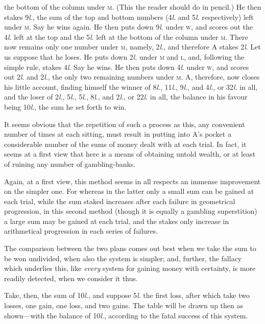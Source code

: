 \documentclass[letterpaper,12pt,oneside,openany]{memoir}
\begin{document}
the bottom of the column under \textsc{m}. (This the reader
should do in pencil.) He then stakes 9\textit{l}., the sum of
the top and bottom numbers (4\textit{l}. and 5\textit{l}. respectively)
left under \textsc{m}. Say he wins again. He then puts down
9\textit{l}. under \textsc{w}, and scores out the 4\textit{l}. left at the top and
the 5\textit{l}. left at the bottom of the column under \textsc{m}. There
now remains only one number under \textsc{m}, namely, 2\textit{l}., and
therefore A stakes 2\textit{l}. Let us suppose that he loses.
He puts down 2\textit{l}. under \textsc{m} and \textsc{l}, and, following the
simple rule, stakes 4\textit{l}. Say he wins. He then puts
down 4\textit{l}. under \textsc{w}, and scores out 2\textit{l}. and 2\textit{l}., the only
two remaining numbers under \textsc{m}. A, therefore, now
closes his little account, finding himself the winner of
8\textit{l}., 11\textit{l}., 9\textit{l}.,
and 4\textit{l}., or 32\textit{l}. in all, and the loser of 2\textit{l}.,
5\textit{l}., 5\textit{l}., 8\textit{l}., and 2\textit{l}., or 22\textit{l}. in all, the balance in his
favour being 10\textit{l}., the sum he set forth to win.

It seems obvious that the repetition of such a process
as this, any convenient number of times at each
sitting, must result in putting into A's pocket a considerable
number of the sums of money dealt with at
each trial. In fact, it seems at a first view that here is
a means of obtaining untold wealth, or at least of ruining
any number of gambling-banks.

Again, at a first view, this method seems in all
respects an immense improvement on the simpler one.
For whereas in the latter only a small sum can be
gained at each trial, while the sum staked increases
after each failure in geometrical progression, in this
second method (though it is equally a gambling superstition)
a large sum may be gained at each trial, and
the stakes only increase in arithmetical progression in
each series of failures.

The comparison between the two plans comes out
best when we take the sum to be won undivided, when
also the system is simpler; and, further, the fallacy
which underlies this, like \emph{every} system for gaining
money with certainty, is more readily detected, when
we consider it thus.

Take, then, the sum of 10\textit{l}., and suppose 5\textit{l}. the
first loss, after which take two losses, one gain, one
loss, and two gains. The table will be drawn up then
as shown---with the balance of 10\textit{l}., according to the
fatal success of this system.
\end{document}
